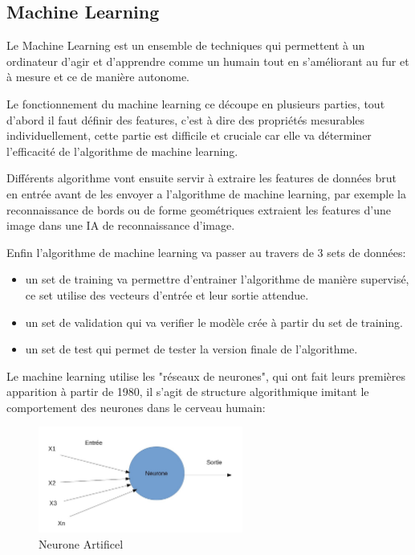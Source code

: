 \subsection{Machine Learning}
Le Machine Learning est un ensemble de techniques qui permettent à un ordinateur 
d'agir et d'apprendre comme un humain tout en s'améliorant au fur et 
à mesure et ce de manière autonome. \newline

Le fonctionnement du machine learning ce découpe en plusieurs parties,
tout d'abord il faut définir des features, c'est à dire des
propriétés mesurables individuellement, cette partie est difficile et cruciale
car elle va déterminer l'efficacité de l'algorithme de machine learning. \newline

Différents algorithme vont ensuite servir à extraire les features de données 
brut en entrée avant de les envoyer a l'algorithme de machine learning, par exemple 
la reconnaissance de bords ou de forme geométriques extraient les features d'une 
image dans une IA de reconnaissance d'image. \newline 

Enfin l'algorithme de machine learning va passer au travers de 3 sets de données:
\begin{itemize}
    \item un set de training va permettre d'entrainer l'algorithme de manière
     supervisé, ce set utilise des vecteurs d'entrée et leur sortie attendue.
    \item un set de validation qui va verifier le modèle crée à partir du set de 
    training.
    \item un set de test qui permet de tester la version finale de l'algorithme. 
    \newline
\end{itemize}

Le machine learning utilise les "réseaux de neurones", qui ont fait leurs premières 
apparition à partir de 1980, il s'agit de structure algorithmique imitant 
le comportement des neurones dans le cerveau humain:


\begin{figure}[!h]
    \centering
    \includegraphics[width=0.6\textwidth]{Images/neuroneartificiel}
    \caption{Neurone Artificel}
	\label{fig:NN2Layers}
\end{figure}

